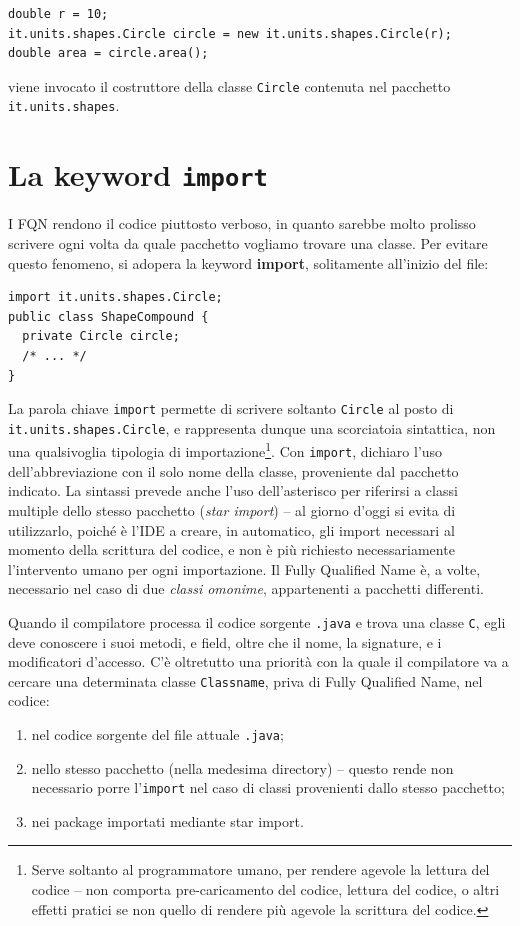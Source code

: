 \documentclass[\fontsizeclass,twocolumn]{\classname}
\theoremstyle{definition}
\theoremstyle{definition}
\begin{document}
\begin{lstlisting}
double r = 10;
it.units.shapes.Circle circle = new it.units.shapes.Circle(r);
double area = circle.area();
\end{lstlisting}

viene invocato il costruttore della classe \texttt{Circle} contenuta nel
pacchetto \texttt{it.units.shapes}.

\section{La keyword \texttt{import}}

I FQN rendono il codice piuttosto verboso, in quanto sarebbe molto prolisso
scrivere ogni volta da quale pacchetto vogliamo trovare una classe. Per evitare
questo fenomeno, si adopera la keyword \textbf{import}, solitamente all'inizio
del file:

\begin{lstlisting}
import it.units.shapes.Circle;
public class ShapeCompound {
  private Circle circle;
  /* ... */
}
\end{lstlisting}

La parola chiave \texttt{import} permette di scrivere soltanto \texttt{Circle}
al posto di \texttt{it.units.shapes.Circle}, e rappresenta dunque una
scorciatoia sintattica, non una qualsivoglia tipologia di
importazione\footnote{Serve soltanto al programmatore umano, per rendere
agevole la lettura del codice \--- non comporta pre-caricamento del
codice, lettura del codice, o altri effetti pratici se non quello di rendere
più agevole la scrittura del codice.}. Con \texttt{import}, dichiaro l'uso
dell'abbreviazione con il solo nome della classe, proveniente dal pacchetto
indicato. La sintassi prevede anche l'uso dell'asterisco per riferirsi a classi
multiple dello stesso pacchetto (\emph{star import}) \--- al giorno d'oggi si
evita di utilizzarlo, poiché è l'IDE a creare, in automatico, gli import
necessari al momento della scrittura del codice, e non è più richiesto
necessariamente l'intervento umano per ogni importazione. Il Fully Qualified
Name è, a volte, necessario nel caso di due \emph{classi omonime}, appartenenti
a pacchetti differenti.

Quando il compilatore processa il codice sorgente \texttt{.java} e trova una
classe \texttt{C}, egli deve conoscere i suoi metodi, e field, oltre che il
nome, la signature, e i modificatori d'accesso. C'è oltretutto una priorità con
la quale il compilatore va a cercare una determinata classe \texttt{Classname},
priva di Fully Qualified Name, nel codice:
\begin{enumerate}
    \item nel codice sorgente del file attuale \texttt{.java};
    \item nello stesso pacchetto (nella medesima directory) \--- questo rende
        non necessario porre l'\texttt{import} nel caso di classi provenienti
        dallo stesso pacchetto;
    \item nei package importati mediante star import.
\end{enumerate}
\end{document}

